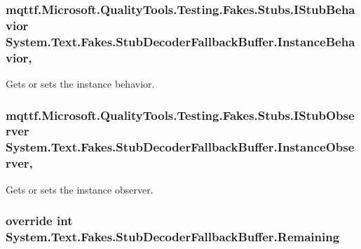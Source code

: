 \hypertarget{class_system_1_1_text_1_1_fakes_1_1_stub_decoder_fallback_buffer_a037c0a6ca1ecfe19317aa682f43411fd}{
\subsubsection[{Instance\-Behavior}]{\setlength{\rightskip}{0pt plus 5cm}mqttf.\-Microsoft.\-Quality\-Tools.\-Testing.\-Fakes.\-Stubs.\-I\-Stub\-Behavior System.\-Text.\-Fakes.\-Stub\-Decoder\-Fallback\-Buffer.\-Instance\-Behavior\hspace{0.3cm}{\ttfamily [get]}, {\ttfamily [set]}}}\label{class_system_1_1_text_1_1_fakes_1_1_stub_decoder_fallback_buffer_a037c0a6ca1ecfe19317aa682f43411fd}


Gets or sets the instance behavior.

\hypertarget{class_system_1_1_text_1_1_fakes_1_1_stub_decoder_fallback_buffer_a378c3e57862b43c94f4dba9f32feb818}{
\subsubsection[{Instance\-Observer}]{\setlength{\rightskip}{0pt plus 5cm}mqttf.\-Microsoft.\-Quality\-Tools.\-Testing.\-Fakes.\-Stubs.\-I\-Stub\-Observer System.\-Text.\-Fakes.\-Stub\-Decoder\-Fallback\-Buffer.\-Instance\-Observer\hspace{0.3cm}{\ttfamily [get]}, {\ttfamily [set]}}}\label{class_system_1_1_text_1_1_fakes_1_1_stub_decoder_fallback_buffer_a378c3e57862b43c94f4dba9f32feb818}


Gets or sets the instance observer.

\hypertarget{class_system_1_1_text_1_1_fakes_1_1_stub_decoder_fallback_buffer_a7eb3a8c797b5257f1deb4478e1cfe6c5}{
\subsubsection[{Remaining}]{\setlength{\rightskip}{0pt plus 5cm}override int System.\-Text.\-Fakes.\-Stub\-Decoder\-Fallback\-Buffer.\-Remaining\hspace{0.3cm}{\ttfamily [get]}}}\label{class_system_1_1_text_1_1_fakes_1_1_stub_decoder_fallback_buffer_a7eb3a8c797b5257f1deb4478e1cfe6c5}


